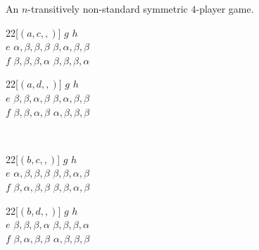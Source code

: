 \begin{example}
An $n$-transitively non-standard symmetric $4$-player game.
\begin{center}
\begin{game}{2}{2}[$(a,c,,)$]
       \>  $g$          \>  $h$ \\
	$e$  \>  $\alpha,\beta,\beta,\beta$  \>  $\beta,\alpha,\beta,\beta$  \\
    $f$  \>  $\beta,\beta,\beta,\alpha$  \>  $\beta,\beta,\beta,\alpha$  
\end{game}
\hspace*{5mm}
\begin{game}{2}{2}[$(a,d,,)$]
       \>  $g$          \>  $h$          \\
    $e$  \>  $\beta,\beta,\alpha,\beta$  \>  $\beta,\alpha,\beta,\beta$  \\
    $f$  \>  $\beta,\beta,\alpha,\beta$  \>  $\alpha,\beta,\beta,\beta$  
\end{game}
\\
\begin{game}{2}{2}[$(b,c,,)$]
       \>  $g$          \>  $h$          \\
    $e$  \>  $\alpha,\beta,\beta,\beta$  \>  $\beta,\beta,\alpha,\beta$  \\
    $f$  \>  $\beta,\alpha,\beta,\beta$  \>  $\beta,\beta,\alpha,\beta$  
\end{game}
\hspace*{5mm}
\begin{game}{2}{2}[$(b,d,,)$]
       \>  $g$          \>  $h$          \\
    $e$  \>  $\beta,\beta,\beta,\alpha$  \>  $\beta,\beta,\beta,\alpha$  \\
    $f$  \>  $\beta,\alpha,\beta,\beta$  \>  $\alpha,\beta,\beta,\beta$  
\end{game}
\end{center}


\end{example}
